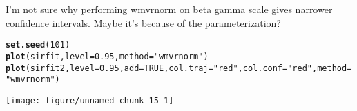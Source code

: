 \documentclass{article}\usepackage[]{graphicx}\usepackage[]{color}
\makeatletter
\def\maxwidth{ %
  \ifdim\Gin@nat@width>\linewidth
    \linewidth
  \else
    \Gin@nat@width
  \fi
}
\newcommand{\hlnum}[1]{\textcolor[rgb]{0.686,0.059,0.569}{#1}}%
\newcommand{\hlstr}[1]{\textcolor[rgb]{0.192,0.494,0.8}{#1}}%
\newcommand{\hlstd}[1]{\textcolor[rgb]{0.345,0.345,0.345}{#1}}%
\newcommand{\hlkwc}[1]{\textcolor[rgb]{0.333,0.667,0.333}{#1}}%
\newcommand{\hlkwd}[1]{\textcolor[rgb]{0.737,0.353,0.396}{\textbf{#1}}}%
\newenvironment{kframe}{%
 \def\at@end@of@kframe{}%
 \ifinner\ifhmode%
  \def\at@end@of@kframe{\end{minipage}}%
  \begin{minipage}{\columnwidth}%
 \fi\fi%
 \def\FrameCommand##1{\hskip\@totalleftmargin \hskip-\fboxsep
 \colorbox{shadecolor}{##1}\hskip-\fboxsep
     \hskip-\linewidth \hskip-\@totalleftmargin \hskip\columnwidth}%
 \MakeFramed {\advance\hsize-\width
   \@totalleftmargin\z@ \linewidth\hsize
   \@setminipage}}%
 {\par\unskip\endMakeFramed%
 \at@end@of@kframe}
\newenvironment{knitrout}{}{} %
\makeatother
\begin{document}
I'm not sure why performing wmvrnorm on beta gamma scale gives narrower confidence intervals. Maybe it's because of the parameterization?

\begin{knitrout}
\color{fgcolor}\begin{kframe}
\begin{alltt}
\hlkwd{set.seed}\hlstd{(}\hlnum{101}\hlstd{)}
\hlkwd{plot}\hlstd{(sirfit,} \hlkwc{level}\hlstd{=}\hlnum{0.95}\hlstd{,} \hlkwc{method}\hlstd{=}\hlstr{"wmvrnorm"}\hlstd{)}
\hlkwd{plot}\hlstd{(sirfit2,} \hlkwc{level}\hlstd{=}\hlnum{0.95}\hlstd{,} \hlkwc{add}\hlstd{=}\hlnum{TRUE}\hlstd{,} \hlkwc{col.traj}\hlstd{=}\hlstr{"red"}\hlstd{,} \hlkwc{col.conf}\hlstd{=}\hlstr{"red"}\hlstd{,} \hlkwc{method}\hlstd{=}\hlstr{"wmvrnorm"}\hlstd{)}
\end{alltt}
\end{kframe}
\texttt{[image: figure/unnamed-chunk-15-1]} 

\end{knitrout}
\end{document}
